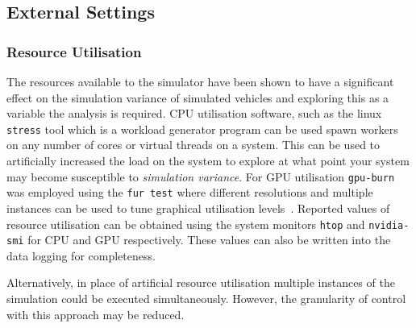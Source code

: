 \documentclass[letterpaper, 10 pt, journal, twoside]{IEEEtran}
\begin{document}


\subsection{External Settings}

\subsubsection{Resource Utilisation}
The resources available to the simulator have been shown to have a significant effect on the simulation variance of simulated vehicles and exploring this as a variable the analysis is required. 
CPU utilisation software, such as the linux \texttt{stress} tool which is a workload generator program can be used spawn workers on any number of cores or virtual threads on a system. This can be used to artificially increased the load on the system to explore at what point your system may become susceptible to \textit{simulation variance}. For GPU utilisation \texttt{gpu-burn} was employed using the \texttt{fur test} where different resolutions and multiple instances can be used to tune graphical utilisation levels~\cite{GPU_stress}. Reported values of resource utilisation can be obtained using the system monitors \texttt{htop} and \texttt{nvidia-smi} for CPU and GPU respectively. These values can also be written into the data logging for completeness.

Alternatively, in place of artificial resource utilisation multiple instances of the simulation could be executed simultaneously. However, the granularity of control with this approach may be reduced.


\end{document}

